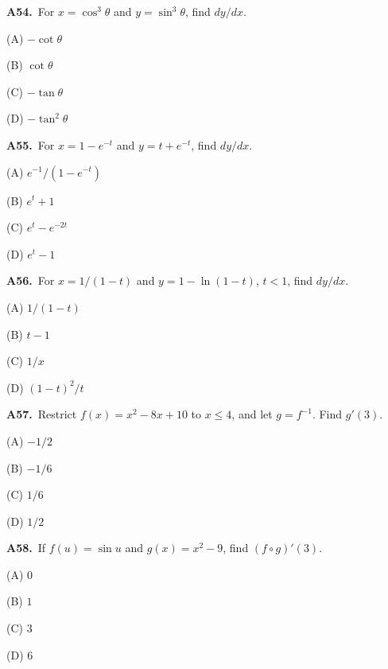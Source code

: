 \documentclass[11pt]{article}
\begin{document}
\bigskip\noindent\textbf{A54.}\ For $x=\cos^3\theta$ and $y=\sin^3\theta$, find $dy/dx$.
\begin{list}{}{\setlength{\leftmargin}{3em}\setlength{\labelwidth}{2.5em}\setlength{\itemsep}{0pt}\setlength{\topsep}{2pt}}
\item[(A)] $-\cot\theta$
\item[(B)] $\cot\theta$
\item[(C)] $-\tan\theta$
\item[(D)] $-\tan^2\theta$
\end{list}

\bigskip\noindent\textbf{A55.}\ For $x=1-e^{-t}$ and $y=t+e^{-t}$, find $dy/dx$.
\begin{list}{}{\setlength{\leftmargin}{3em}\setlength{\labelwidth}{2.5em}\setlength{\itemsep}{0pt}\setlength{\topsep}{2pt}}
\item[(A)] $e^{-1}/(1-e^{-t})$
\item[(B)] $e^t+1$
\item[(C)] $e^t-e^{-2t}$
\item[(D)] $e^t-1$
\end{list}

\bigskip\noindent\textbf{A56.}\ For $x=1/(1-t)$ and $y=1-\ln(1-t)$, $t<1$, find $dy/dx$.
\begin{list}{}{\setlength{\leftmargin}{3em}\setlength{\labelwidth}{2.5em}\setlength{\itemsep}{0pt}\setlength{\topsep}{2pt}}
\item[(A)] $1/(1-t)$
\item[(B)] $t-1$
\item[(C)] $1/x$
\item[(D)] $(1-t)^2/t$
\end{list}

\bigskip\noindent\textbf{A57.}\ Restrict $f(x)=x^2-8x+10$ to $x\le4$, and let $g=f^{-1}$. Find $g'(3)$.
\begin{list}{}{\setlength{\leftmargin}{3em}\setlength{\labelwidth}{2.5em}\setlength{\itemsep}{0pt}\setlength{\topsep}{2pt}}
\item[(A)] $-1/2$
\item[(B)] $-1/6$
\item[(C)] $1/6$
\item[(D)] $1/2$
\end{list}

\bigskip\noindent\textbf{A58.}\ If $f(u)=\sin u$ and $g(x)=x^2-9$, find $(f\circ g)'(3)$.
\begin{list}{}{\setlength{\leftmargin}{3em}\setlength{\labelwidth}{2.5em}\setlength{\itemsep}{0pt}\setlength{\topsep}{2pt}}
\item[(A)] $0$
\item[(B)] $1$
\item[(C)] $3$
\item[(D)] $6$
\end{list}
\end{document}
